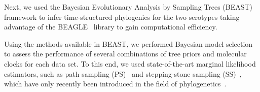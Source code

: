 \documentclass[10pt]{article}
\begin{document}
Next, we used the Bayesian Evolutionary Analysis by Sampling Trees (BEAST)~\cite{beast2012} framework to infer time-structured phylogenies for the two serotypes taking advantage of the  BEAGLE~\cite{BEAGLE} library to gain computational efficiency.

Using the methods available in BEAST, we performed Bayesian model selection to assess the performance of several combinations of tree priors and molecular clocks for each data set.
To this end, we used state-of-the-art marginal likelihood estimators, such as path sampling (PS)~\cite{LartillotPhilippe} and stepping-stone sampling (SS)~\cite{Xie}, which have only recently been introduced in the field of phylogenetics~\cite{LartillotPhilippe, Xie, Baele2012, Baele2013a, Baele2013b}.
\end{document}
